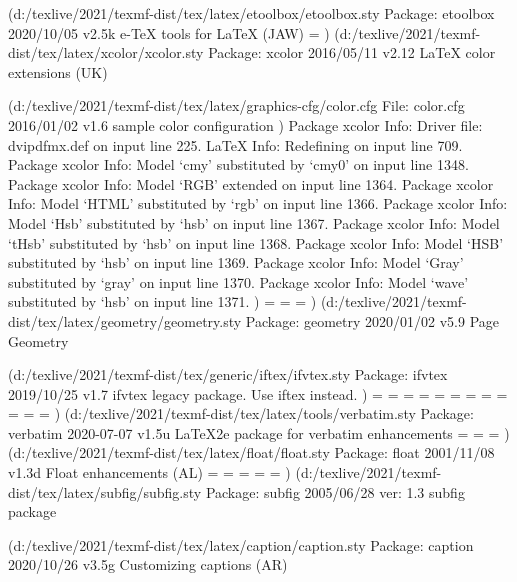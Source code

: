 (d:/texlive/2021/texmf-dist/tex/latex/etoolbox/etoolbox.sty
Package: etoolbox 2020/10/05 v2.5k e-TeX tools for LaTeX (JAW)
\etb@tempcnta=
)
(d:/texlive/2021/texmf-dist/tex/latex/xcolor/xcolor.sty
Package: xcolor 2016/05/11 v2.12 LaTeX color extensions (UK)

(d:/texlive/2021/texmf-dist/tex/latex/graphics-cfg/color.cfg
File: color.cfg 2016/01/02 v1.6 sample color configuration
)
Package xcolor Info: Driver file: dvipdfmx.def on input line 225.
LaTeX Info: Redefining \color on input line 709.
Package xcolor Info: Model `cmy' substituted by `cmy0' on input line 1348.
Package xcolor Info: Model `RGB' extended on input line 1364.
Package xcolor Info: Model `HTML' substituted by `rgb' on input line 1366.
Package xcolor Info: Model `Hsb' substituted by `hsb' on input line 1367.
Package xcolor Info: Model `tHsb' substituted by `hsb' on input line 1368.
Package xcolor Info: Model `HSB' substituted by `hsb' on input line 1369.
Package xcolor Info: Model `Gray' substituted by `gray' on input line 1370.
Package xcolor Info: Model `wave' substituted by `hsb' on input line 1371.
)
\opt@nesting=
\opt@idx=
\opt@choiceord=
)
(d:/texlive/2021/texmf-dist/tex/latex/geometry/geometry.sty
Package: geometry 2020/01/02 v5.9 Page Geometry

(d:/texlive/2021/texmf-dist/tex/generic/iftex/ifvtex.sty
Package: ifvtex 2019/10/25 v1.7 ifvtex legacy package. Use iftex instead.
)
\Gm@cnth=
\Gm@cntv=
\c@Gm@tempcnt=
\Gm@bindingoffset=
\Gm@wd@mp=
\Gm@odd@mp=
\Gm@even@mp=
\Gm@layoutwidth=
\Gm@layoutheight=
\Gm@layouthoffset=
\Gm@layoutvoffset=
\Gm@dimlist=
)
(d:/texlive/2021/texmf-dist/tex/latex/tools/verbatim.sty
Package: verbatim 2020-07-07 v1.5u LaTeX2e package for verbatim enhancements
\every@verbatim=
\verbatim@line=
\verbatim@in@stream=
)
(d:/texlive/2021/texmf-dist/tex/latex/float/float.sty
Package: float 2001/11/08 v1.3d Float enhancements (AL)
\c@float@type=
\float@exts=
\float@box=
\@float@everytoks=
\@floatcapt=
)
(d:/texlive/2021/texmf-dist/tex/latex/subfig/subfig.sty
Package: subfig 2005/06/28 ver: 1.3 subfig package

(d:/texlive/2021/texmf-dist/tex/latex/caption/caption.sty
Package: caption 2020/10/26 v3.5g Customizing captions (AR)

